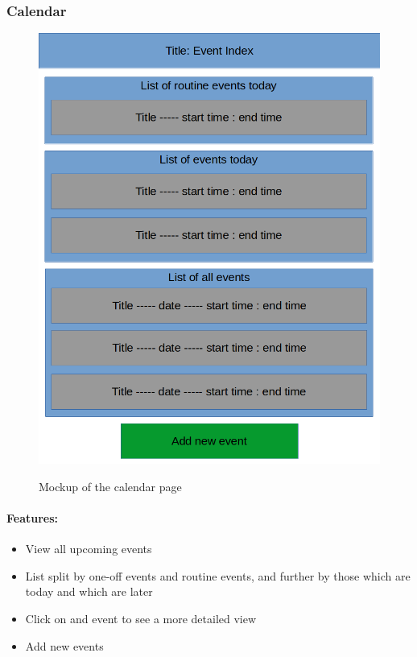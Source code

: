 \documentclass{article}
\begin{document}
\subsubsection{Calendar}
\begin{minipage}{0.35\textwidth}
\begin{figure}[H]
\includegraphics[width=\linewidth]{Mockups/event_index.png}
\label{fig:event_index_mockup}
\caption{Mockup of the calendar page}
\end{figure}
\end{minipage} \hfill
\begin{minipage}{0.6\textwidth}
\paragraph{Features:}
\begin{itemize}
\item View all upcoming events
\item List split by one-off events and routine events,
  and further by those which are today and which are later
\item Click on and event to see a more detailed view
\item Add new events
\end{itemize}
\end{minipage}
\end{document}
